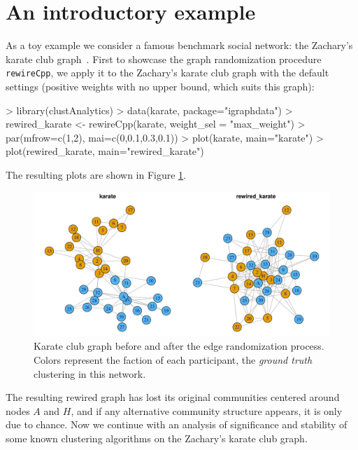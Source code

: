 \section{An introductory example}
As a toy example we consider a famous benchmark social network: the Zachary's karate club graph~\citep{Zachary}.
First to showcase the graph randomization procedure {\tt rewireCpp}, we apply it to the Zachary's karate club graph with the default settings (positive weights with no upper bound, which suits this graph):
\begin{example}
> library(clustAnalytics)
> data(karate, package="igraphdata")
> rewired_karate <- rewireCpp(karate, weight_sel = "max_weight")
> par(mfrow=c(1,2), mai=c(0,0.1,0.3,0.1))
> plot(karate, main="karate")
> plot(rewired_karate, main="rewired_karate")
\end{example}
The resulting plots are shown in Figure \ref{fig:rewired_karate}.

\begin{figure}[htb!]  
\begin{center}
\includegraphics[width=\textwidth]{figs/karate_rewired_karate.pdf}
\caption{\label{fig:rewired_karate} \small Karate club graph before and after the edge randomization process. Colors represent the faction of each participant, the \textit{ground truth} clustering in this network.}
\end{center}
\end{figure}

The resulting rewired graph has lost its original communities centered around nodes $A$ and $H$, and if any alternative community structure appears, it is only due to chance. Now we continue with an analysis of significance and stability of some known clustering algorithms on  the Zachary's karate club graph. 

